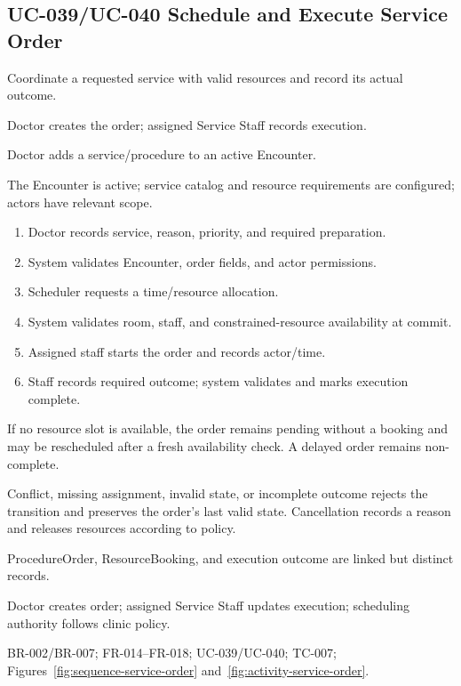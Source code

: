 \documentclass[a4paper,12pt]{article}
\begin{document}
\subsection{UC-039/UC-040 Schedule and Execute Service Order}
\begin{description}[leftmargin=2.6cm,style=nextline]
\item[Goal] Coordinate a requested service with valid resources and record its actual outcome.
\item[Primary actors] Doctor creates the order; assigned Service Staff records execution.
\item[Trigger] Doctor adds a service/procedure to an active Encounter.
\item[Preconditions] The Encounter is active; service catalog and resource requirements are configured; actors have relevant scope.
\item[Main success flow]
\begin{enumerate}[leftmargin=1.4em]
  \item Doctor records service, reason, priority, and required preparation.
  \item System validates Encounter, order fields, and actor permissions.
  \item Scheduler requests a time/resource allocation.
  \item System validates room, staff, and constrained-resource availability at commit.
  \item Assigned staff starts the order and records actor/time.
  \item Staff records required outcome; system validates and marks execution complete.
\end{enumerate}
\item[Alternative flows] If no resource slot is available, the order remains pending without a booking and may be rescheduled after a fresh availability check. A delayed order remains non-complete.
\item[Exception flows] Conflict, missing assignment, invalid state, or incomplete outcome rejects the transition and preserves the order's last valid state. Cancellation records a reason and releases resources according to policy.
\item[Postconditions and data] ProcedureOrder, ResourceBooking, and execution outcome are linked but distinct records.
\item[Authorization] Doctor creates order; assigned Service Staff updates execution; scheduling authority follows clinic policy.
\item[Trace] BR-002/BR-007; FR-014--FR-018; UC-039/UC-040; TC-007; Figures~\ref{fig:sequence-service-order} and~\ref{fig:activity-service-order}.
\end{description}
\end{document}
